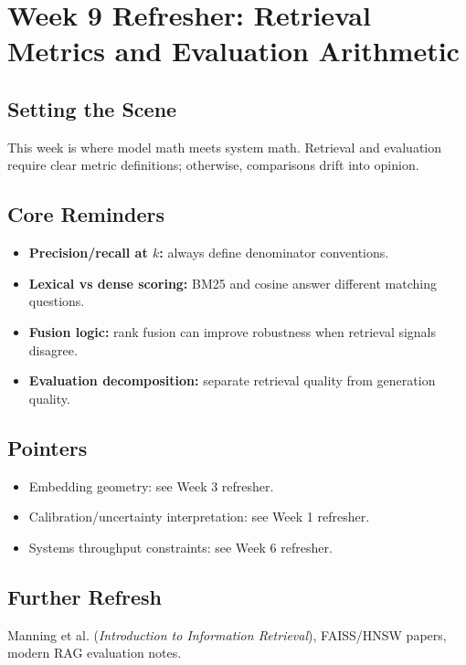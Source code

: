 \section{Week 9 Refresher: Retrieval Metrics and Evaluation Arithmetic}

\subsection*{Setting the Scene}
This week is where model math meets system math. Retrieval and evaluation require clear metric definitions; otherwise, comparisons drift into opinion.

\subsection*{Core Reminders}
\begin{itemize}[leftmargin=1.5em]
  \item \textbf{Precision/recall at $k$:} always define denominator conventions.
  \item \textbf{Lexical vs dense scoring:} BM25 and cosine answer different matching questions.
  \item \textbf{Fusion logic:} rank fusion can improve robustness when retrieval signals disagree.
  \item \textbf{Evaluation decomposition:} separate retrieval quality from generation quality.
\end{itemize}

\subsection*{Pointers}
\begin{itemize}[leftmargin=1.5em]
  \item Embedding geometry: see Week 3 refresher.
  \item Calibration/uncertainty interpretation: see Week 1 refresher.
  \item Systems throughput constraints: see Week 6 refresher.
\end{itemize}

\subsection*{Further Refresh}
Manning et al. (\emph{Introduction to Information Retrieval}), FAISS/HNSW papers, modern RAG evaluation notes.
